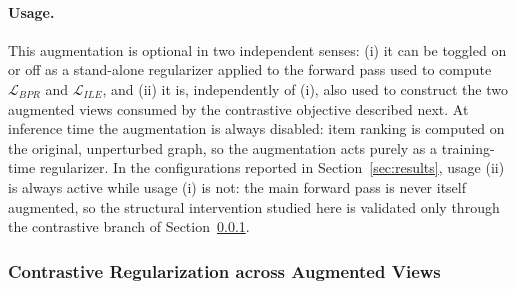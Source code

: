 \paragraph{Usage.}
This augmentation is optional in two independent senses: (i) it can be toggled on or off as a
stand-alone regularizer applied to the forward pass used to compute $\mathcal{L}_{BPR}$ and
$\mathcal{L}_{ILE}$, and (ii) it is, independently of (i), also used to construct the two
augmented views consumed by the contrastive objective described next. At inference time the
augmentation is always disabled: item ranking is computed on the original, unperturbed graph,
so the augmentation acts purely as a training-time regularizer. In the configurations
reported in Section~\ref{sec:results}, usage (ii) is always active while usage (i) is not: the
main forward pass is never itself augmented, so the structural intervention studied here is
validated only through the contrastive branch of Section~\ref{sec:contrastive_learning}.

\subsubsection{Contrastive Regularization across Augmented Views}
\label{sec:contrastive_learning}

